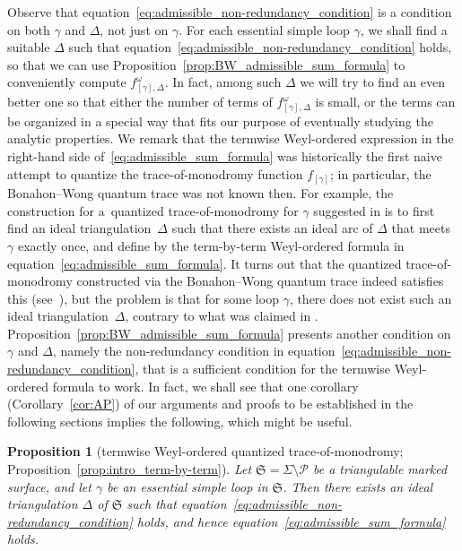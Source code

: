 \documentclass[pdftex]{sigma}
\numberwithin{equation}{section}
\newtheorem{Proposition}[Theorem]{Proposition}
\theoremstyle{definition}
\begin{document}
Observe that equation~\eqref{eq:admissible_non-redundancy_condition} is a condition on both $\gamma$ and $\Delta$, not just on $\gamma$. For each essential simple loop $\gamma$, we shall find a suitable $\Delta$ such that equation~\eqref{eq:admissible_non-redundancy_condition} holds, so that we can use Proposition~\ref{prop:BW_admissible_sum_formula} to conveniently compute $f^\omega_{[\gamma],\Delta}$. In fact, among such $\Delta$ we will try to find an even better one so that either the number of terms of $f^\omega_{[\gamma],\Delta}$ is small, or the terms can be organized in a special way that fits our purpose of eventually studying the analytic properties.
We remark that the termwise Weyl-ordered expression in the right-hand side of~\eqref{eq:admissible_sum_formula} was historically the first naive attempt to quantize the trace-of-monodromy function $f_{[\gamma]}$; in particular, the Bonahon--Wong quantum trace was not known then. For example, the construction for a~quantized trace-of-monodromy for $\gamma$ suggested in \cite{F97, CF2} is to first find an ideal triangulation~$\Delta$ such that there exists an ideal arc of $\Delta$ that meets $\gamma$ exactly once, and define  by the term-by-term Weyl-ordered formula in equation~\eqref{eq:admissible_sum_formula}. It turns out that the quantized trace-of-monodromy constructed via the Bonahon--Wong quantum trace indeed satisfies this (see~\cite{AK}), but the problem is that for some loop $\gamma$, there does not exist such an ideal triangulation~$\Delta$, contrary to what was claimed in \cite[below equation~(57)]{F97}. Proposition~\ref{prop:BW_admissible_sum_formula} presents another condition on $\gamma$ and $\Delta$, namely the non-redundancy condition in equation~\eqref{eq:admissible_non-redundancy_condition}, that is a sufficient condition for the termwise Weyl-ordered formula to work. In fact, we shall see that one corollary (Corollary~\ref{cor:AP}) of our arguments and proofs to be established in the following sections implies the following, which might be useful.
\begin{Proposition}[termwise Weyl-ordered quantized trace-of-monodromy; Proposition~\ref{prop:intro_term-by-term}]
\label{prop:term-by-term_Weyl-ordered_f_omega_gamma_Delta}
Let $\mathfrak{S} = \Sigma\setminus\mathcal{P}$ be a triangulable marked surface, and let $\gamma$ be an essential simple loop in $\mathfrak{S}$. Then there exists an ideal triangulation $\Delta$ of $\mathfrak{S}$ such that equation~\eqref{eq:admissible_non-redundancy_condition} holds, and hence equation~\eqref{eq:admissible_sum_formula} holds.
\end{Proposition}
\end{document}
